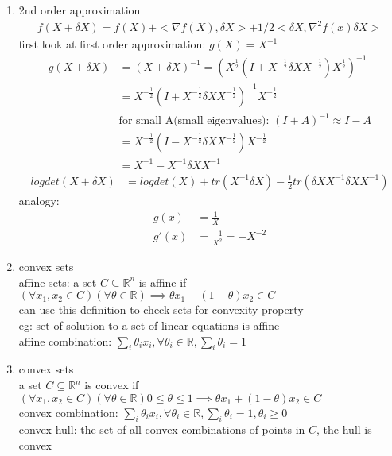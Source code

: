 \documentclass[12pt,letter]{article}
\newcommand{\R}{\mathbb{R}}
\begin{document}
\begin{enumerate}
\item 2nd order approximation
  \begin{align*}
    f(X+\delta X) = f(X) + <\nabla f(X), \delta X>  + 1/2 <\delta X, \nabla^2 f(x) \delta X>
  \end{align*}
  first look at first order approximation: $g(X) = X^{-1}$
  \begin{align*}
    g(X+\delta X) &= (X+\delta X)^{-1} = (X^{\frac{1}{2}}(I+X^{-\frac{1}{2}} \delta X X^{-\frac{1}{2}}) X^{\frac{1}{2}})^{-1}\\
                  &= X^{-\frac{1}{2}}(I+X^{-\frac{1}{2}} \delta X X^{-\frac{1}{2}})^{-1} X^{-\frac{1}{2}}\\
                  &\text{for small A(small eigenvalues): } (I+A)^{-1} \approx I-A\\
                  &= X^{-\frac{1}{2}}(I-X^{-\frac{1}{2}} \delta X X^{-\frac{1}{2}}) X^{-\frac{1}{2}}\\
                  &= X^{-1} - X^{-1} \delta X X^{-1}
  \end{align*}
  \begin{align*}
    logdet(X+\delta X)&=logdet(X)+tr(X^{-1}\delta X) - \frac{1}{2} tr(\delta X X^{-1} \delta X X^{-1})
  \end{align*}
  analogy:
  \begin{align*}
    g(x)&=\frac{1}{X}\\
    g'(x)&=\frac{-1}{X^2} = -X^{-2}
  \end{align*}
\item convex sets\\
  affine sets: a set $C \subseteq \R^n$ is affine if $(\forall x_1, x_2 \in C)(\forall \theta \in \R) \implies \theta x_1 +(1-\theta) x_2 \in C$\\
  can use this definition to check sets for convexity property\\
  eg: set of solution to a set of linear equations is affine\\
  affine combination: $\sum_i \theta_i x_i, \forall \theta_i \in \R, \sum_i \theta_i = 1$\\
\item convex sets\\
  a set $C \subseteq \R^n$ is convex if $(\forall x_1,x_2 \in C)(\forall \theta \in \R) 0 \leq \theta \leq 1 \implies \theta x_1 +(1-\theta)x_2 \in C$\\
  convex combination: $\sum_i \theta_i x_i, \forall \theta_i \in \R, \sum_i \theta_i = 1, \theta_i \geq 0$\\
  convex hull: the set of all convex combinations of points in $C$, the hull is convex\\

\end{enumerate}
\end{document}
